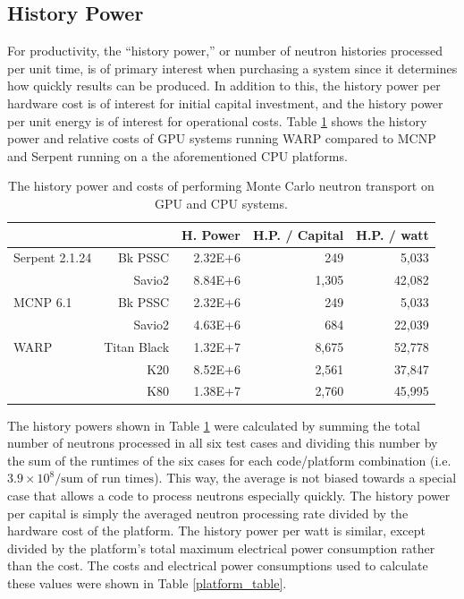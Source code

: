 \documentclass[preprint,12pt]{elsarticle}
\begin{document}
\newpage
\subsection{History Power}

For productivity, the ``history power,'' or  number of neutron histories processed per unit time, is of primary interest when purchasing a system since it determines how quickly results can be produced.  In addition to this, the history power per hardware cost is of interest for initial capital investment, and the history power per unit energy is of interest for operational costs.  Table \ref{history_power} shows the history power and relative costs of GPU systems running WARP compared to MCNP and Serpent running on a the aforementioned CPU platforms.  

\begin{table}[h]
\centering
\caption{The history power and costs of performing Monte Carlo neutron transport on GPU and CPU systems.}
\label{history_power}
\small
\begin{tabular}{| l r | r | r | r |}
\cline{3-5}
\multicolumn{2}{c|}{}             & H. Power   & H.P. / Capital   & H.P. / watt  \\
\hline                            
Serpent 2.1.24   &   Bk PSSC      & 2.32E+6    &   249           &  5,033        \\
                 &   Savio2       & 8.84E+6    & 1,305           & 42,082        \\
\hline                                 
MCNP 6.1         &   Bk PSSC      & 2.32E+6    &   249           &  5,033        \\
                 &   Savio2       & 4.63E+6    &   684           & 22,039        \\
\hline                            
WARP             &   Titan Black  & 1.32E+7    & 8,675           & 52,778        \\
                 &   K20          & 8.52E+6    & 2,561           & 37,847        \\
                 &   K80          & 1.38E+7    & 2,760           & 45,995        \\
\hline
\end{tabular}
\end{table}

The history powers shown in Table \ref{history_power} were calculated by summing the total number of neutrons processed in all six test cases and dividing this number by the sum of the runtimes of the six cases for each code/platform combination (i.e.\ $3.9\times10^8 / \textrm{sum of run times}$).  This way, the average is not biased towards a special case that allows a code to process neutrons especially quickly.  The history power per capital is simply the averaged neutron processing rate divided by the hardware cost of the platform.  The history power per watt is similar, except divided by the platform's total maximum electrical power consumption rather than the cost.  The costs and electrical power consumptions used to calculate these values were shown in Table \ref{platform_table}.
\end{document}

